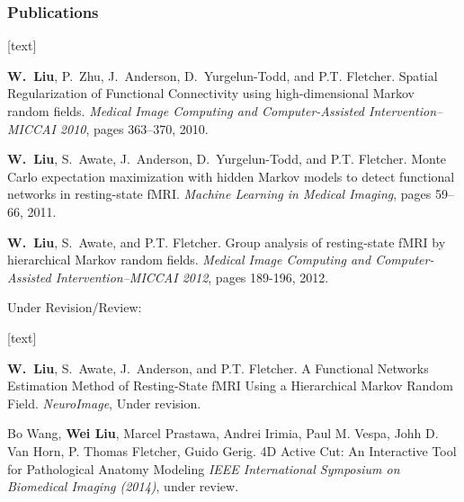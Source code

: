 \documentclass[sansserif, 10pt]{beamer}
\begin{document}
\begin{frame}
  \frametitle{Publications}

  \renewcommand{\refname}{List of Publications}
  {\scriptsize
    [text]
    \begin{thebibliography}{}
      \textbf{W.~Liu}, P.~Zhu, J.~Anderson, D.~Yurgelun-Todd, and P.T. Fletcher.
      \newblock Spatial Regularization of Functional Connectivity using high-dimensional {M}arkov random fields.
                \newblock \emph{Medical Image Computing and Computer-Assisted
                  Intervention--MICCAI 2010}, pages 363--370, 2010.

       \textbf{W.~Liu}, S.~Awate, J.~Anderson, D.~Yurgelun-Todd, and P.T. Fletcher.
       \newblock Monte {C}arlo expectation maximization with hidden {M}arkov
       models to detect functional networks in resting-state {fMRI}.
       \newblock \emph{Machine Learning in Medical Imaging}, pages 59--66, 2011.

       \textbf{W.~Liu}, S.~Awate, and P.T. Fletcher.
       \newblock Group analysis of resting-state {fMRI} by hierarchical {M}arkov
       random fields.
       \newblock \emph{Medical Image Computing and Computer-Assisted Intervention--MICCAI 2012}, pages 189-196, 2012.
    \end{thebibliography}
  }
\vspace{5pt}
  Under Revision/Review:
{\scriptsize
  [text]
  \begin{thebibliography}{}
      \textbf{W.~Liu}, S.~Awate, J.~Anderson, and P.T. Fletcher.
      \newblock A Functional Networks Estimation Method of Resting-State fMRI Using a
    Hierarchical Markov Random Field.
    \newblock \emph{NeuroImage}, Under revision.

      Bo Wang, \textbf{Wei Liu}, Marcel Prastawa, Andrei Irimia, Paul M. Vespa, Johh D. Van Horn, P. Thomas Fletcher, Guido Gerig.
      \newblock 4D Active Cut: An Interactive Tool for Pathological Anatomy Modeling
      \newblock \emph{IEEE International Symposium on Biomedical Imaging (2014)}, under review.
  \end{thebibliography}
}
\end{frame}
\end{document}
